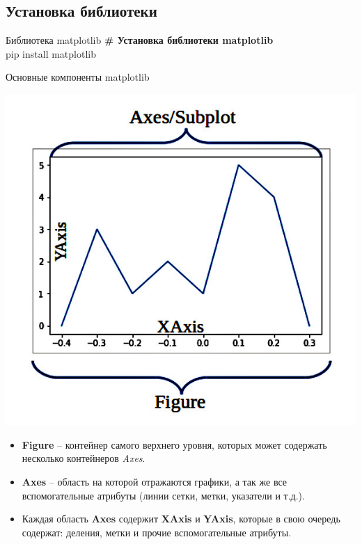 \documentclass[12pt]{beamer}
\begin{document}
\subsection{Установка библиотеки}
\begin{frame}{Библиотека matplotlib}
\textbf{\# Установка библиотеки matplotlib} \\
\vspace{0.5cm}
pip install matplotlib
\end{frame}

\begin{frame}{Основные компоненты matplotlib}

\begin{minipage}{0.35\textwidth}
  \begin{flushleft}
	\includegraphics[scale=0.2]{image/mpl_anatomy.jpg}
	\vspace{2.2cm}
  \end{flushleft}
\end{minipage}
\begin{minipage}{0.6\textwidth}
  \begin{flushright}  
	\begin{itemize}
		\item \textbf{Figure} -- контейнер самого верхнего уровня, которых может содержать несколько контейнеров \textit{Axes}. 
		\item \textbf{Axes} -- область на которой отражаются графики, а так же все вспомогательные атрибуты (линии сетки, метки, указатели и т.д.).
		\item Каждая область \textbf{Axes} содержит \textbf{XAxis} и \textbf{YAxis}, которые в свою очередь содержат: деления, метки и прочие вспомогательные атрибуты. 
\end{itemize}
  \end{flushright}
\end{minipage}

\end{frame}
\end{document}
